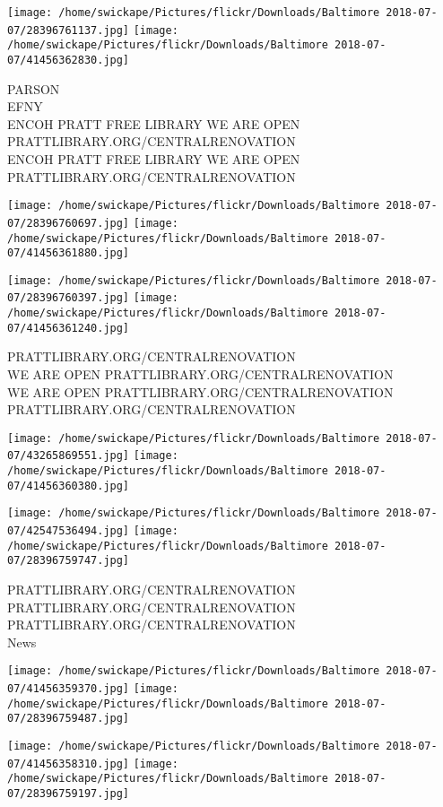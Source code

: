 \documentclass[10pt,letterpaper]{article}
\begin{document}
\texttt{[image: /home/swickape/Pictures/flickr/Downloads/Baltimore 2018-07-07/28396761137.jpg]}
\texttt{[image: /home/swickape/Pictures/flickr/Downloads/Baltimore 2018-07-07/41456362830.jpg]}

PARSON\\
EFNY\\
ENCOH PRATT FREE LIBRARY WE ARE OPEN PRATTLIBRARY.ORG/CENTRALRENOVATION\\
ENCOH PRATT FREE LIBRARY WE ARE OPEN PRATTLIBRARY.ORG/CENTRALRENOVATION
\pagebreak

\texttt{[image: /home/swickape/Pictures/flickr/Downloads/Baltimore 2018-07-07/28396760697.jpg]}
\texttt{[image: /home/swickape/Pictures/flickr/Downloads/Baltimore 2018-07-07/41456361880.jpg]}

\texttt{[image: /home/swickape/Pictures/flickr/Downloads/Baltimore 2018-07-07/28396760397.jpg]}
\texttt{[image: /home/swickape/Pictures/flickr/Downloads/Baltimore 2018-07-07/41456361240.jpg]}

PRATTLIBRARY.ORG/CENTRALRENOVATION\\
WE ARE OPEN PRATTLIBRARY.ORG/CENTRALRENOVATION\\
WE ARE OPEN PRATTLIBRARY.ORG/CENTRALRENOVATION\\
PRATTLIBRARY.ORG/CENTRALRENOVATION
\pagebreak

\texttt{[image: /home/swickape/Pictures/flickr/Downloads/Baltimore 2018-07-07/43265869551.jpg]}
\texttt{[image: /home/swickape/Pictures/flickr/Downloads/Baltimore 2018-07-07/41456360380.jpg]}

\texttt{[image: /home/swickape/Pictures/flickr/Downloads/Baltimore 2018-07-07/42547536494.jpg]}
\texttt{[image: /home/swickape/Pictures/flickr/Downloads/Baltimore 2018-07-07/28396759747.jpg]}

PRATTLIBRARY.ORG/CENTRALRENOVATION\\
PRATTLIBRARY.ORG/CENTRALRENOVATION\\
PRATTLIBRARY.ORG/CENTRALRENOVATION\\
News
\pagebreak

\texttt{[image: /home/swickape/Pictures/flickr/Downloads/Baltimore 2018-07-07/41456359370.jpg]}
\texttt{[image: /home/swickape/Pictures/flickr/Downloads/Baltimore 2018-07-07/28396759487.jpg]}

\texttt{[image: /home/swickape/Pictures/flickr/Downloads/Baltimore 2018-07-07/41456358310.jpg]}
\texttt{[image: /home/swickape/Pictures/flickr/Downloads/Baltimore 2018-07-07/28396759197.jpg]}
\end{document}
